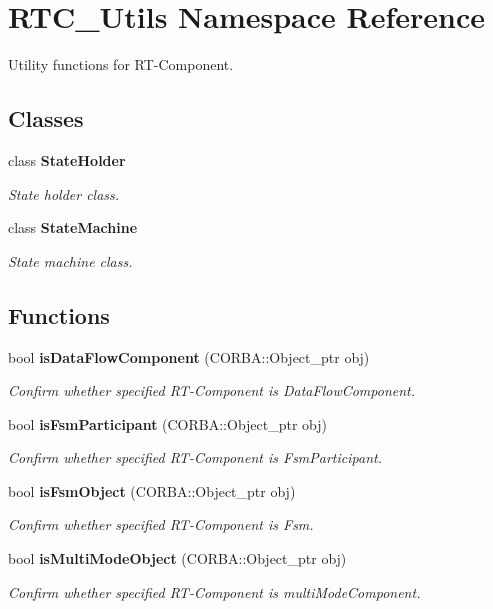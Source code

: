 \section{RTC\_\-Utils Namespace Reference}
\label{namespaceRTC__Utils}


Utility functions for RT-\/Component.  


\subsection*{Classes}
\begin{DoxyCompactItemize}
\item 
class {\bf StateHolder}
\begin{DoxyCompactList}\small\item\em State holder class. \item\end{DoxyCompactList}\item 
class {\bf StateMachine}
\begin{DoxyCompactList}\small\item\em State machine class. \item\end{DoxyCompactList}\end{DoxyCompactItemize}
\subsection*{Functions}
\begin{DoxyCompactItemize}
\item 
bool {\bf isDataFlowComponent} (CORBA::Object\_\-ptr obj)
\begin{DoxyCompactList}\small\item\em Confirm whether specified RT-\/Component is DataFlowComponent. \item\end{DoxyCompactList}\item 
bool {\bf isFsmParticipant} (CORBA::Object\_\-ptr obj)
\begin{DoxyCompactList}\small\item\em Confirm whether specified RT-\/Component is FsmParticipant. \item\end{DoxyCompactList}\item 
bool {\bf isFsmObject} (CORBA::Object\_\-ptr obj)
\begin{DoxyCompactList}\small\item\em Confirm whether specified RT-\/Component is Fsm. \item\end{DoxyCompactList}\item 
bool {\bf isMultiModeObject} (CORBA::Object\_\-ptr obj)
\begin{DoxyCompactList}\small\item\em Confirm whether specified RT-\/Component is multiModeComponent. \item\end{DoxyCompactList}\end{DoxyCompactItemize}


